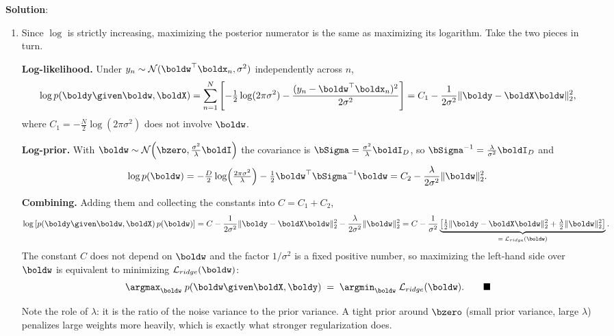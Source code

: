 \documentclass[submit]{../harvardml}
\newenvironment{solution}{
    \vspace{2mm}
    \color{blue}\noindent\textbf{Solution}:
}{}
\begin{document}
\begin{solution}

\begin{enumerate}

\item
Since $\log$ is strictly increasing, maximizing the posterior numerator is the
same as maximizing its logarithm. Take the two pieces in turn.

\textbf{Log-likelihood.} Under $y_n \sim \mathcal{N}(\boldw^\top\boldx_n,
\sigma^2)$ independently across $n$,
\[
  \log p(\boldy \given \boldw, \boldX)
  = \sum_{n=1}^{N}\left[-\tfrac12\log(2\pi\sigma^2)
     - \frac{(y_n - \boldw^\top \boldx_n)^2}{2\sigma^2}\right]
  = C_1 - \frac{1}{2\sigma^2}\|\boldy - \boldX\boldw\|_2^2 ,
\]
where $C_1 = -\tfrac N2 \log(2\pi\sigma^2)$ does not involve $\boldw$.

\textbf{Log-prior.} With $\boldw \sim \mathcal{N}\!\left(\bzero,
\frac{\sigma^2}{\lambda}\boldI\right)$ the covariance is
$\bSigma = \frac{\sigma^2}{\lambda}\boldI_D$, so $\bSigma^{-1} =
\frac{\lambda}{\sigma^2}\boldI_D$ and
\[
  \log p(\boldw)
  = -\tfrac D2 \log\!\left(\tfrac{2\pi\sigma^2}{\lambda}\right)
    - \tfrac12 \boldw^\top \bSigma^{-1}\boldw
  = C_2 - \frac{\lambda}{2\sigma^2}\|\boldw\|_2^2 .
\]

\textbf{Combining.} Adding them and collecting the constants into $C = C_1+C_2$,
\[
  \log\left[p(\boldy\given\boldw,\boldX)\,p(\boldw)\right]
  = C - \frac{1}{2\sigma^2}\|\boldy - \boldX\boldw\|_2^2
      - \frac{\lambda}{2\sigma^2}\|\boldw\|_2^2
  = C - \frac{1}{\sigma^2}\underbrace{\left[\tfrac12\|\boldy - \boldX\boldw\|_2^2
      + \tfrac{\lambda}{2}\|\boldw\|_2^2\right]}_{=\;\mathcal{L}_{ridge}(\boldw)} .
\]
The constant $C$ does not depend on $\boldw$ and the factor $1/\sigma^2$ is a
fixed positive number, so maximizing the left-hand side over $\boldw$ is
equivalent to minimizing $\mathcal{L}_{ridge}(\boldw)$:
\[
  \argmax_{\boldw}\; p(\boldw \given \boldX, \boldy)
  \;=\; \argmin_{\boldw}\; \mathcal{L}_{ridge}(\boldw). \qquad \blacksquare
\]

\noindent Note the role of $\lambda$: it is the ratio of the noise variance to
the prior variance. A tight prior around $\bzero$ (small prior variance, large
$\lambda$) penalizes large weights more heavily, which is exactly what stronger
regularization does.


\end{enumerate}
\end{solution}
\end{document}
